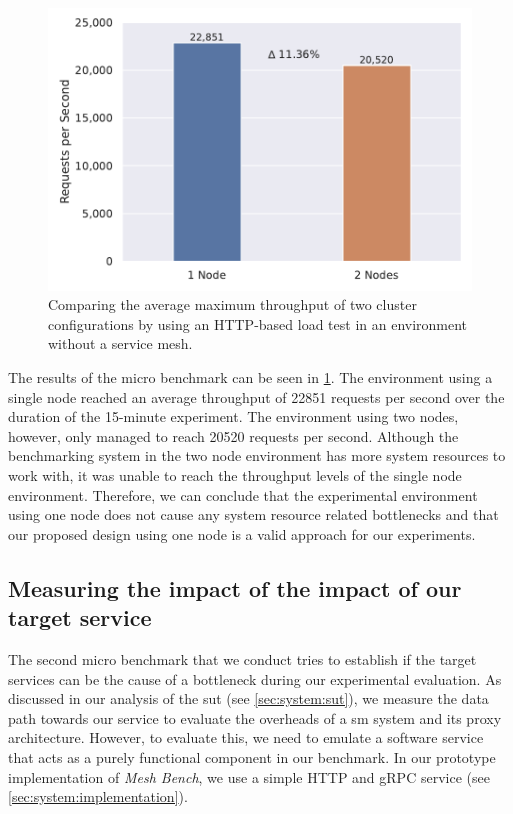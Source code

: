 \begin{figure}[!t]
    \centering
    
    \includegraphics[width=0.8\linewidth]{5_experimental_evaluation/figures/microbench-node-count.pdf}

    \caption[Micro benchmark - Comparing the average maximum throughput of two cluster configurations.]{Comparing the average maximum throughput of two cluster configurations by using an HTTP-based load test in an environment without a service mesh.}
    
    \label{fig:microbench:node-count}
\end{figure}

The results of the micro benchmark can be seen in \cref{fig:microbench:node-count}. The environment using a single node reached an average throughput of 22851 requests per second over the duration of the 15-minute experiment. The environment using two nodes, however, only managed to reach 20520 requests per second. Although the benchmarking system in the two node environment has more system resources to work with, it was unable to reach the throughput levels of the single node environment. Therefore, we can conclude that the experimental environment using one node does not cause any system resource related bottlenecks and that our proposed design using one node is a valid approach for our experiments.


\subsection{Measuring the impact of the impact of our target service}
\label{sec:experiments:microbenchmarks:target-svc}

The second micro benchmark that we conduct tries to establish if the target services can be the cause of a bottleneck during our experimental evaluation. As discussed in our analysis of the \gls{sut} (see \cref{sec:system:sut}), we measure the data path towards our service to evaluate the overheads of a \gls{sm} system and its proxy architecture. However, to evaluate this, we need to emulate a software service that acts as a purely functional component in our benchmark. In our prototype implementation of \textit{Mesh Bench}, we use a simple HTTP and gRPC service (see \cref{sec:system:implementation}). 

